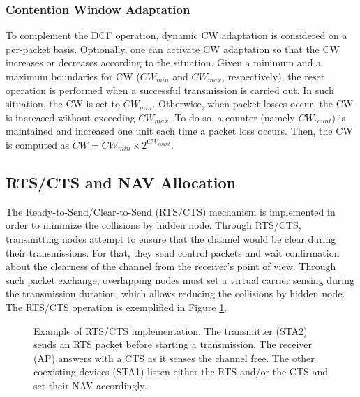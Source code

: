 \documentclass[a4paper]{article}
\begin{document}
		\subsubsection{Contention Window Adaptation}
		\label{section:cw_adaptation}
		To complement the DCF operation, dynamic CW adaptation is considered on a per-packet basis. Optionally, one can activate CW adaptation so that the CW increases or decreases according to the situation. Given a minimum and a maximum boundaries for CW ($CW_{min}$ and $CW_{max}$, respectively), the reset operation is performed when a successful transmission is carried out. In such situation, the CW is set to $CW_{min}$. Otherwise, when packet losses occur, the CW is increased without exceeding $CW_{max}$. To do so, a counter (namely $CW_{count}$) is maintained and increased one unit each time a packet loss occurs. Then, the CW is computed as $CW = CW_{min} \times 2^{CW_{count}}$.
	
	\subsection{RTS/CTS and NAV Allocation}
	The Ready-to-Send/Clear-to-Send (RTS/CTS) mechanism is implemented in order to minimize the collisions by hidden node. Through RTS/CTS, transmitting nodes attempt to ensure that the channel would be clear during their transmissions. For that, they send control packets and wait confirmation about the clearness of the channel from the receiver's point of view. Through such packet exchange, overlapping nodes must set a virtual carrier sensing during the transmission duration, which allows reducing the collisions by hidden node. The RTS/CTS operation is exemplified in Figure \ref{fig:rts_cts_mechanism}.
	\begin{figure}[h!]
		\centering
		\caption{Example of RTS/CTS implementation. The transmitter (STA2) sends an RTS packet before starting a transmission. The receiver (AP) answers with a CTS as it senses the channel free. The other coexisting devices (STA1) listen either the RTS and/or the CTS and set their NAV accordingly.}
		\label{fig:rts_cts_mechanism}
	\end{figure}	
		
\end{document}
